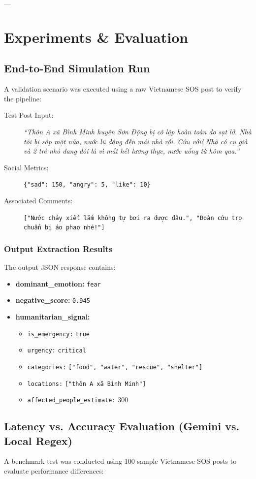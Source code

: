 \documentclass[12pt,a4paper]{article}
\begin{document}
---

\section{Experiments \& Evaluation}

\subsection{End-to-End Simulation Run}
A validation scenario was executed using a raw Vietnamese SOS post to verify the pipeline:
\begin{description}
    \item[Test Post Input:] \textit{``Thôn A xã Bình Minh huyện Sơn Động bị cô lập hoàn toàn do sạt lở. Nhà tôi bị sập một nửa, nước lũ dâng đến mái nhà rồi. Cứu với! Nhà có cụ già và 2 trẻ nhỏ đang đói lả vì mất hết lương thực, nước uống từ hôm qua.''}
    \item[Social Metrics:] \texttt{\{"sad": 150, "angry": 5, "like": 10\}}
    \item[Associated Comments:] \texttt{["Nước chảy xiết lắm không tự bơi ra được đâu.", "Đoàn cứu trợ chuẩn bị áo phao nhé!"]}
\end{description}

\subsubsection{Output Extraction Results}
The output JSON response contains:
\begin{itemize}
    \item \textbf{dominant\_emotion:} \texttt{fear}
    \item \textbf{negative\_score:} \texttt{0.945}
    \item \textbf{humanitarian\_signal:}
    \begin{itemize}
        \item \texttt{is\_emergency:} \texttt{true}
        \item \texttt{urgency:} \texttt{critical}
        \item \texttt{categories:} \texttt{["food", "water", "rescue", "shelter"]}
        \item \texttt{locations:} \texttt{["thôn A xã Bình Minh"]}
        \item \texttt{affected\_people\_estimate:} 300
    \end{itemize}
\end{itemize}

\subsection{Latency vs. Accuracy Evaluation (Gemini vs. Local Regex)}
A benchmark test was conducted using 100 sample Vietnamese SOS posts to evaluate performance differences:
\end{document}
